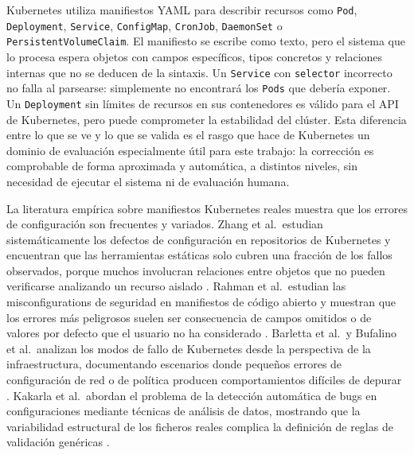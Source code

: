 Kubernetes utiliza manifiestos YAML para describir recursos como \texttt{Pod}, \texttt{Deployment}, \texttt{Service}, \texttt{ConfigMap}, \texttt{CronJob}, \texttt{DaemonSet} o \texttt{PersistentVolumeClaim}. El manifiesto se escribe como texto, pero el sistema que lo procesa espera objetos con campos específicos, tipos concretos y relaciones internas que no se deducen de la sintaxis. Un \texttt{Service} con \texttt{selector} incorrecto no falla al parsearse: simplemente no encontrará los \texttt{Pods} que debería exponer. Un \texttt{Deployment} sin límites de recursos en sus contenedores es válido para el API de Kubernetes, pero puede comprometer la estabilidad del clúster. Esta diferencia entre lo que se ve y lo que se valida es el rasgo que hace de Kubernetes un dominio de evaluación especialmente útil para este trabajo: la corrección es comprobable de forma aproximada y automática, a distintos niveles, sin necesidad de ejecutar el sistema ni de evaluación humana.

La literatura empírica sobre manifiestos Kubernetes reales muestra que los errores de configuración son frecuentes y variados. Zhang et al.\ estudian sistemáticamente los defectos de configuración en repositorios de Kubernetes y encuentran que las herramientas estáticas solo cubren una fracción de los fallos observados, porque muchos involucran relaciones entre objetos que no pueden verificarse analizando un recurso aislado \citep{zhang2025kubernetesdefects}. Rahman et al.\ estudian las misconfigurations de seguridad en manifiestos de código abierto y muestran que los errores más peligrosos suelen ser consecuencia de campos omitidos o de valores por defecto que el usuario no ha considerado \citep{rahman2023securityk8s}. Barletta et al.\ y Bufalino et al.\ analizan los modos de fallo de Kubernetes desde la perspectiva de la infraestructura, documentando escenarios donde pequeños errores de configuración de red o de política producen comportamientos difíciles de depurar \citep{fonseca2024mutiny, bufalino2025insidejob}. Kakarla et al.\ abordan el problema de la detección automática de bugs en configuraciones mediante técnicas de análisis de datos, mostrando que la variabilidad estructural de los ficheros reales complica la definición de reglas de validación genéricas \citep{kakarla2024diffy}.


